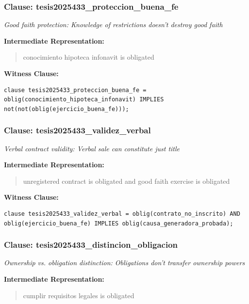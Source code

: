 \documentclass[11pt,a4paper]{article}
\begin{document}
\subsubsection{Clause: tesis2025433\_proteccion\_buena\_fe}

\textit{Good faith protection: Knowledge of restrictions doesn't destroy good faith}

\textbf{Intermediate Representation:}

\begin{quote}
conocimiento hipoteca infonavit is obligated
\end{quote}

\textbf{Witness Clause:}

\begin{lstlisting}[style=witnessstyle, language=Witness]
clause tesis2025433_proteccion_buena_fe = oblig(conocimiento_hipoteca_infonavit) IMPLIES not(not(oblig(ejercicio_buena_fe)));
\end{lstlisting}

\subsubsection{Clause: tesis2025433\_validez\_verbal}

\textit{Verbal contract validity: Verbal sale can constitute just title}

\textbf{Intermediate Representation:}

\begin{quote}
unregistered contract is obligated and good faith exercise is obligated
\end{quote}

\textbf{Witness Clause:}

\begin{lstlisting}[style=witnessstyle, language=Witness]
clause tesis2025433_validez_verbal = oblig(contrato_no_inscrito) AND oblig(ejercicio_buena_fe) IMPLIES oblig(causa_generadora_probada);
\end{lstlisting}

\subsubsection{Clause: tesis2025433\_distincion\_obligacion}

\textit{Ownership vs. obligation distinction: Obligations don't transfer ownership powers}

\textbf{Intermediate Representation:}

\begin{quote}
cumplir requisitos legales is obligated
\end{quote}
\end{document}
